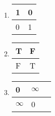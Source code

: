 \begin{enumerate}
    \item

          \begin{minipage}{0.48\textwidth}
            \begin{tabular}{|l|l|}
              \hline
              1 & 0 \\ \hline
              0 & 1 \\ \hline
            \end{tabular}
          \end{minipage}
    \item

          \begin{minipage}{0.48\textwidth}
            \begin{tabular}{|l|l|}
              \hline
              T & F \\ \hline
              F & T \\ \hline
            \end{tabular}
          \end{minipage}

    \item

          \begin{minipage}{0.48\textwidth}
            \begin{tabular}{|l|l|l|}
              \hline
              0        & $\infty$ \\ \hline
              $\infty$ & 0        \\ \hline
            \end{tabular}
          \end{minipage}

  \end{enumerate}
